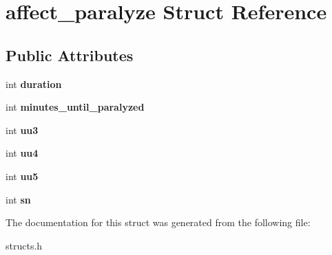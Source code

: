 \hypertarget{structaffect__paralyze}{\section{affect\-\_\-paralyze Struct Reference}
\label{structaffect__paralyze}
}
\subsection*{Public Attributes}
\begin{DoxyCompactItemize}
\item 
\hypertarget{structaffect__paralyze_adf1d5a35c8008cbad0ca5ce8698bb0ce}{int {\bfseries duration}}\label{structaffect__paralyze_adf1d5a35c8008cbad0ca5ce8698bb0ce}

\item 
\hypertarget{structaffect__paralyze_a04d90c64680ac57d6ef11d1bdea032c5}{int {\bfseries minutes\-\_\-until\-\_\-paralyzed}}\label{structaffect__paralyze_a04d90c64680ac57d6ef11d1bdea032c5}

\item 
\hypertarget{structaffect__paralyze_a0680ad907c4ea80ef81bcbda834c4105}{int {\bfseries uu3}}\label{structaffect__paralyze_a0680ad907c4ea80ef81bcbda834c4105}

\item 
\hypertarget{structaffect__paralyze_a82390b9ea39b080722ba847b7436d7e0}{int {\bfseries uu4}}\label{structaffect__paralyze_a82390b9ea39b080722ba847b7436d7e0}

\item 
\hypertarget{structaffect__paralyze_aae65e45a3da12fcd435b53ea0af8d630}{int {\bfseries uu5}}\label{structaffect__paralyze_aae65e45a3da12fcd435b53ea0af8d630}

\item 
\hypertarget{structaffect__paralyze_aa401701137676487fbdea56cbd0f2753}{int {\bfseries sn}}\label{structaffect__paralyze_aa401701137676487fbdea56cbd0f2753}

\end{DoxyCompactItemize}


The documentation for this struct was generated from the following file\-:\begin{DoxyCompactItemize}
\item 
structs.\-h\end{DoxyCompactItemize}
